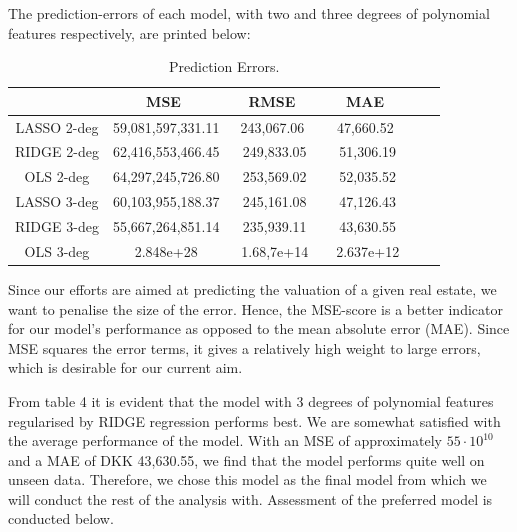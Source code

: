 \documentclass[12pt,a4paper]{article}
\begin{document}
The prediction-errors of each model, with two and three degrees of polynomial features respectively, are printed below:
\begin{table}[H]
\begin{center}
\caption{Prediction Errors. \label{time}}
\begin{tabular}{| c | c | c | c | c | c |} 
\hline
   & \ MSE \ & \, RMSE \ & \ MAE \ \\ \hline
   LASSO 2-deg & 59,081,597,331.11 & \ 243,067.06 \  & \ 47,660.52 \ \\ 
  RIDGE 2-deg & 62,416,553,466.45 & 249,833.05 & 51,306.19  \\ 
  OLS 2-deg & 64,297,245,726.80 & 253,569.02 & 52,035.52  \\ \hline 
  LASSO 3-deg & 60,103,955,188.37 & 245,161.08 & 47,126.43  \\ 
  RIDGE 3-deg & 55,667,264,851.14 & 235,939.11 & 43,630.55  \\ 
  OLS 3-deg & 2.848e+28 & 1.68,7e+14 & 2.637e+12  \\ \hline
\end{tabular}
\end{center}
\end{table}
Since our efforts are aimed at predicting the valuation of a given real estate, we want to penalise the size of the error. Hence, the MSE-score is a better indicator for our model's performance as opposed to the mean absolute error (MAE). Since MSE squares the error terms, it gives a relatively high weight to large errors, which is desirable for our current aim. 

From table 4 it is evident that the model with 3 degrees of polynomial features regularised by RIDGE regression performs best. We are somewhat satisfied with the average performance of the model. With an MSE of approximately $55\cdot10^{10}$ and a MAE of DKK 43,630.55, we find that the model performs quite well on unseen data. Therefore, we chose this model as the final model from which we will conduct the rest of the analysis with. Assessment of the preferred model is conducted below. \newline
\end{document}
